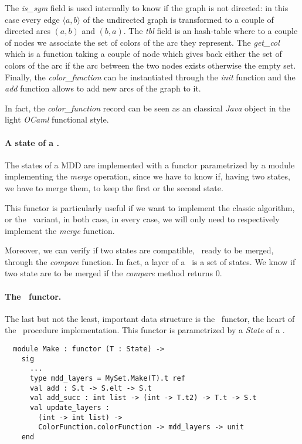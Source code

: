The \textit{is\_sym} field is used internally to know if the graph is not directed: in this case every edge $\langle a, b \rangle$ of the undirected graph is transformed to a couple of directed arcs $(a,b)$ and $(b,a)$. The \textit{tbl} field is an hash-table where to a couple of nodes we associate the set of colors of the arc they represent. The \textit{get\_col} which is a function taking a couple of node which gives back either the set of colors of the arc if the arc between the two nodes exists otherwise the empty set. Finally, the \textit{color\_function} can be instantiated through the \textit{init} function and the \textit{add} function allows to add new arcs of the graph to it.

In fact, the \textit{color\_function} record can be seen as an classical \textit{Java} object in the light \textit{OCaml} functional style.

\paragraph{A state of a \mdd.} The states of a MDD are implemented with a functor\cite{ocamlfunctor} parametrized by a module implementing the \textit{merge} operation, since we have to know if, having two states, we have to merge them, to keep the first or the second state.

This functor is particularly useful if we want to implement the classic algorithm, or the \alldiff\ variant, in both case, in every case, we will only need to respectively implement the \textit{merge} function.

Moreover, we can verify if two states are compatible, \ie\ ready to be merged, through the \textit{compare} function. In fact, a layer of a \mdd\ is a set of states. We know if two state are to be merged if the \textit{compare} method returns $0$.

\paragraph{The \mdd\ functor.} The last but not the least, important data structure is the \mdd\ functor, the heart of the \mdd\ procedure implementation. This functor is parametrized by a \textit{State} of a \mdd.

\begin{verbatim}
  module Make : functor (T : State) ->
    sig
      ...
      type mdd_layers = MySet.Make(T).t ref
      val add : S.t -> S.elt -> S.t
      val add_succ : int list -> (int -> T.t2) -> T.t -> S.t
      val update_layers :
        (int -> int list) ->
        ColorFunction.colorFunction -> mdd_layers -> unit
    end
\end{verbatim}


